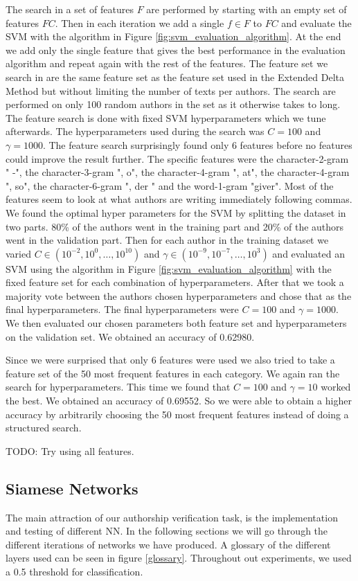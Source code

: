 The search in a set of features $F$ are performed by starting with an
empty set of features $FC$. Then in each iteration we add a single
$f \in F$ to $FC$ and evaluate the SVM with the algorithm in Figure
\ref{fig:svm_evaluation_algorithm}. At the end we add only the single feature
that gives the best performance in the evaluation algorithm and repeat again
with the rest of the features. The feature set we search in are the same feature
set as the feature set used in the Extended Delta Method but without limiting
the number of texts per authors. The search are performed on only 100 random
authors in the set as it otherwise takes to long. The feature search is done
with fixed SVM hyperparameters which we tune afterwards. The hyperparameters
used during the search was $C = 100$ and $\gamma = 1000$. The feature search
surprisingly found only 6 features before no features could improve the
result further. The specific features were the character-2-gram " -", the
character-3-gram ", o", the character-4-gram ", at", the character-4-gram ",
so", the character-6-gram ", der " and the word-1-gram "giver". Most of the
features seem to look at what authors are writing immediately following commas.
We found the optimal hyper parameters for the SVM by splitting the dataset
in two parts. 80\% of the authors went in the training part and 20\% of the
authors went in the validation part. Then for each author in the training
dataset we varied $C \in (10^{-2}, 10^0, \dots, 10^{10})$ and $\gamma \in
(10^{-9}, 10^{-7}, \dots, 10^3)$ and evaluated an SVM using the algorithm in
Figure \ref{fig:svm_evaluation_algorithm} with the fixed feature set for each
combination of hyperparameters. After that we took a majority vote between the
authors chosen hyperparameters and chose that as the final hyperparameters. The
final hyperparameters were $C = 100$ and $\gamma = 1000$. We then evaluated our
chosen parameters both feature set and hyperparameters on the validation set. We
obtained an accuracy of 0.62980.

Since we were surprised that only 6 features were used we also tried to take a
feature set of the 50 most frequent features in each category. We again ran the
search for hyperparameters. This time we found that $C = 100$ and $\gamma = 10$
worked the best. We obtained an accuracy of 0.69552. So we were able to obtain a
higher accuracy by arbitrarily choosing the 50 most frequent features instead of
doing a structured search.

TODO: Try using all features.


\subsection{Siamese Networks} The main attraction of our authorship verification
task, is the implementation and testing of different \gls{NN}. In the following
sections we will go through the different iterations of networks we have
produced. A glossary of the different layers used can be seen in figure
\ref{glossary}. Throughout out experiments, we used a 0.5 threshold for
classification.

